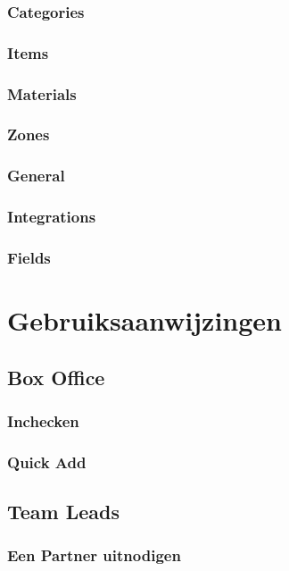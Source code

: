 \documentclass[]{memoir}
\begin{document}
\subsection{Categories}
\subsection{Items}
\subsection{Materials}
\subsection{Zones}
\subsection{General}
\subsection{Integrations}
\subsection{Fields}

\chapter{Gebruiksaanwijzingen}

\section{Box Office}
\subsection{Inchecken}
\subsection{Quick Add}

\section{Team Leads}
\subsection{Een Partner uitnodigen}
\end{document}
